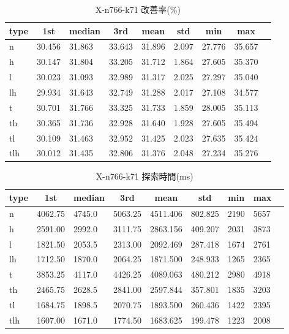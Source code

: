 \begin{table}[htbp]
    \centering
    \caption{X-n766-k71 改善率(\%)}
    \begin{tabular}{|l|l|l|l|l|l|l|l|l|}\hline
    \multicolumn{1}{|c|}{\textbf{type}}
    &\multicolumn{1}{|c|}{\textbf{1st}}
    &\multicolumn{1}{c|}{\textbf{median}}
    &\multicolumn{1}{c|}{\textbf{3rd}}
    &\multicolumn{1}{c|}{\textbf{mean}}
    &\multicolumn{1}{c|}{\textbf{std}}
    &\multicolumn{1}{c|}{\textbf{min}}
    &\multicolumn{1}{c|}{\textbf{max}}\\\hline
	n & 30.456 & 31.863 & 33.643 & 31.896 & 2.097 & 27.776 & 35.657\\\hline
	h & 30.147 & 31.804 & 33.205 & 31.712 & 1.864 & 27.605 & 35.370\\\hline
	l & 30.023 & 31.093 & 32.989 & 31.317 & 2.025 & 27.297 & 35.040\\\hline
	lh & 29.934 & 31.643 & 32.749 & 31.288 & 2.017 & 27.108 & 34.577\\\hline
	t & 30.701 & 31.766 & 33.325 & 31.733 & 1.859 & 28.005 & 35.113\\\hline
	th & 30.365 & 31.736 & 32.928 & 31.640 & 1.928 & 27.605 & 35.494\\\hline
	tl & 30.109 & 31.463 & 32.952 & 31.425 & 2.023 & 27.635 & 35.424\\\hline
	tlh & 30.012 & 31.435 & 32.806 & 31.376 & 2.048 & 27.234 & 35.276\\\hline
	\end{tabular}
\end{table}
\begin{table}[htbp]
    \centering
    \caption{X-n766-k71 探索時間(ms)}
    \begin{tabular}{|l|l|l|l|l|l|l|l|l|}\hline
    \multicolumn{1}{|c|}{\textbf{type}}
    &\multicolumn{1}{|c|}{\textbf{1st}}
    &\multicolumn{1}{c|}{\textbf{median}}
    &\multicolumn{1}{c|}{\textbf{3rd}}
    &\multicolumn{1}{c|}{\textbf{mean}}
    &\multicolumn{1}{c|}{\textbf{std}}
    &\multicolumn{1}{c|}{\textbf{min}}
    &\multicolumn{1}{c|}{\textbf{max}}\\\hline
	n & 4062.75 & 4745.0 & 5063.25 & 4511.406 & 802.825 & 2190 & 5657\\\hline
	h & 2591.00 & 2992.0 & 3111.75 & 2863.156 & 409.207 & 2031 & 3873\\\hline
	l & 1821.50 & 2053.5 & 2313.00 & 2092.469 & 287.418 & 1674 & 2761\\\hline
	lh & 1712.50 & 1870.0 & 2064.25 & 1871.500 & 248.933 & 1265 & 2365\\\hline
	t & 3853.25 & 4117.0 & 4426.25 & 4089.063 & 480.212 & 2980 & 4918\\\hline
	th & 2465.75 & 2628.5 & 2841.00 & 2597.844 & 357.801 & 1835 & 3203\\\hline
	tl & 1684.75 & 1898.5 & 2070.75 & 1893.500 & 260.436 & 1422 & 2395\\\hline
	tlh & 1607.00 & 1671.0 & 1774.50 & 1683.625 & 199.478 & 1223 & 2008\\\hline
	\end{tabular}
\end{table}
